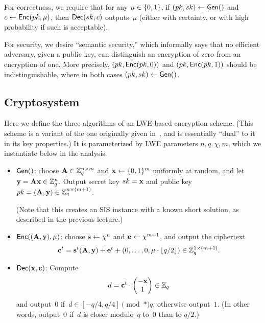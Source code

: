 \documentclass[11pt]{article}
\begin{document}
For correctness, we require that for any $\mu \in \{0,1\}$, if
$(pk,sk) \gets \mathsf{Gen}()$ and $c \gets \mathsf{Enc}(pk,\mu)$, then
$\mathsf{Dec}(sk,c)$ outputs~$\mu$ (either with certainty, or with high
probability if such is acceptable).

For security, we desire ``semantic security,'' which informally says
that no efficient adversary, given a public key, can distinguish an
encryption of zero from an encryption of one. More precisely,
$(pk,\mathsf{Enc}(pk,0))$ and $(pk,\mathsf{Enc}(pk,1))$ should be
indistinguishable, where in both cases $(pk,sk) \gets \mathsf{Gen}()$.

\subsection{Cryptosystem}
\label{sec:cryptosystem}

Here we define the three algorithms of an LWE-based encryption scheme.
(This scheme is a variant of the one originally given
in~\cite{DBLP:journals/jacm/Regev09}, and is essentially ``dual'' to
it in its key properties.) It is parameterized by LWE parameters
$n,q,\chi,m$, which we instantiate below in the analysis.
\begin{itemize}
\item $\mathsf{Gen}()$: choose $\mathbf{A} \in \mathbb{Z}_q^{n\times m}$ and
  $\mathbf{x} \leftarrow \{0,1\}^m$ uniformly at random, and let
  $\mathbf{y} = \mathbf{A} \mathbf{x} \in \mathbb{Z}_q^{n}$. Output secret key $sk = \mathbf{x}$
  and public key $pk = (\mathbf{A}, \mathbf{y}) \in \mathbb{Z}_q^{n \times (m+1)}$.

  (Note that this creates an SIS instance with a known short solution,
  as described in the previous lecture.)

\item $\mathsf{Enc}((\mathbf{A},\mathbf{y}),\mu)$: choose $\mathbf{s} \leftarrow \chi^n$
  and $\mathbf{e} \leftarrow \chi^{m+1}$, and output the ciphertext
  \[ \mathbf{c}^t = \mathbf{s}^t (\mathbf{A}, \mathbf{y}) + \mathbf{e}^t + (0,\ldots,0,\mu
    \cdot \lfloor q/2\rfloor) \in \mathbb{Z}_q^{1 \times (m+1)}. \]

\item $\mathsf{Dec}(\mathbf{x},\mathbf{c})$: Compute
  \[ d = \mathbf{c}^t \cdot
    \begin{pmatrix}
      -\mathbf{x} \\ 1
    \end{pmatrix} \in \mathbb{Z}_q
  \]
  and output~$0$ if~$d \in [-q/4, q/4] \pmod*{q}$, otherwise
  output~$1$. (In other words, output~$0$ if~$d$ is closer modulo~$q$
  to~$0$ than to $q/2$.)
\end{itemize}
\end{document}
